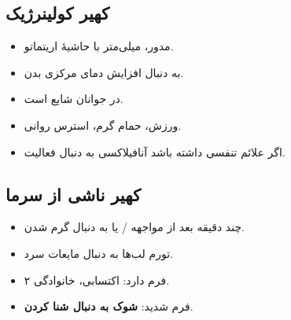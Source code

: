 \documentclass[12pt,a4paper]{article}
\begin{document}
\subsection*{کهیر کولینرژیک}
\begin{itemize}
  \item مدور،  میلی‌متر با حاشیهٔ اریتماتو.
  \item به دنبال افزایش دمای مرکزی بدن.
  \item در جوانان شایع است.
  \item ورزش، حمام گرم، استرس روانی.
  \item اگر علائم تنفسی داشته باشد \ANarrow{} آنافیلاکسی به دنبال فعالیت.
\end{itemize}

\clearpage
{}

\subsection*{کهیر ناشی از سرما}
\begin{itemize}
  \item چند دقیقه بعد از مواجهه / یا به دنبال گرم شدن.
  \item تورم لب‌ها به دنبال مایعات سرد.
  \item ۲ فرم دارد: اکتسابی، خانوادگی.
  \item فرم شدید: \textbf{شوک به دنبال شنا کردن}.
\end{itemize}
\end{document}
